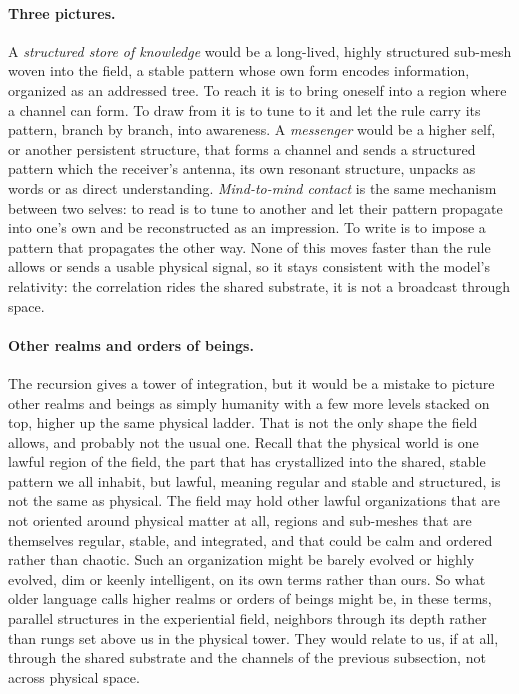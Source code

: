 \paragraph{Three pictures.}
A \emph{structured store of knowledge} would be a long-lived, highly structured sub-mesh woven
into the field, a stable pattern whose own form encodes information, organized as an addressed
tree. To reach it is to bring oneself into a region where a channel can form. To draw from it is
to tune to it and let the rule carry its pattern, branch by branch, into awareness. A
\emph{messenger} would be a higher self, or another persistent structure, that forms a channel
and sends a structured pattern which the receiver's antenna, its own resonant structure, unpacks
as words or as direct understanding. \emph{Mind-to-mind contact} is the same mechanism between
two selves: to read is to tune to another and let their pattern propagate into one's own and be
reconstructed as an impression. To write is to impose a pattern that propagates the other way.
None of this moves faster than the rule allows or sends a usable physical signal, so it stays
consistent with the model's relativity: the correlation rides the shared substrate, it is not a
broadcast through space.

\paragraph{Other realms and orders of beings.}
The recursion gives a tower of integration, but it would be a mistake to picture other realms
and beings as simply humanity with a few more levels stacked on top, higher up the same physical
ladder. That is not the only shape the field allows, and probably not the usual one. Recall that
the physical world is one lawful region of the field, the part that has crystallized into the
shared, stable pattern we all inhabit, but lawful, meaning regular and stable and structured, is
not the same as physical. The field may hold other lawful organizations that are not oriented
around physical matter at all, regions and sub-meshes that are themselves regular, stable, and
integrated, and that could be calm and ordered rather than chaotic. Such an organization might be barely evolved or highly
evolved, dim or keenly intelligent, on its own terms rather than ours. So what older language
calls higher realms or orders of beings might be, in these terms, parallel structures in the
experiential field, neighbors through its depth rather than rungs set above us in the physical
tower. They would relate to us, if at all, through the shared substrate and the channels of the
previous subsection, not across physical space.


